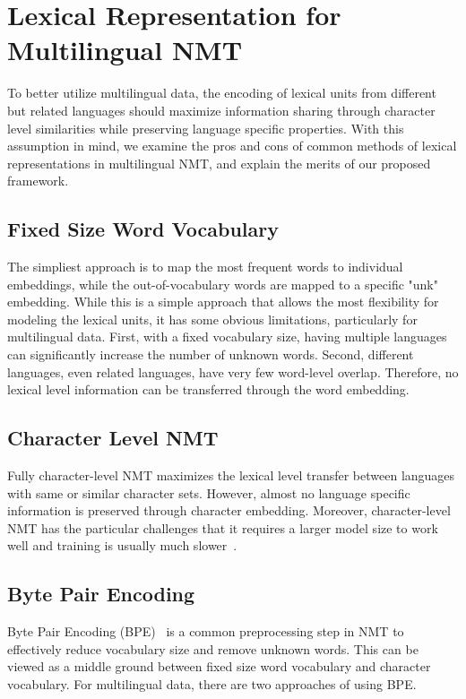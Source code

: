 \section{\label{sec:vocab_reduction}Lexical Representation for Multilingual NMT}
 To better utilize multilingual data, the encoding of lexical units from different but related languages should maximize information sharing through character level similarities while preserving language specific properties. With this assumption in mind, we examine the pros and cons of common methods of lexical representations in multilingual NMT, and explain the merits of our proposed framework.

\subsection{Fixed Size Word Vocabulary}
The simpliest approach is to map the most frequent words to individual embeddings, while the out-of-vocabulary words are mapped to a specific "unk" embedding. While this is a simple approach that allows the most flexibility for modeling the lexical units, it has some obvious limitations, particularly for multilingual data. First, with a fixed vocabulary size, having multiple languages can significantly increase the number of unknown words. Second, different languages, even related languages, have very few word-level overlap. Therefore, no lexical level information can be transferred through the word embedding. 

\subsection{Character Level NMT}
Fully character-level NMT maximizes the lexical level transfer between languages with same or similar character sets. However, almost no language specific information is preserved through character embedding. Moreover, character-level NMT has the particular challenges that it requires a larger model size to work well and training is usually much slower~\citep{fully_char_nmt,char_nmt_compression}.

\subsection{Byte Pair Encoding}
Byte Pair Encoding (BPE)~\citep{bpe} is a common preprocessing step in NMT to effectively reduce vocabulary size and remove unknown words. This can be viewed as a middle ground between fixed size word vocabulary and character vocabulary. For multilingual data, there are two approaches of using BPE. 
